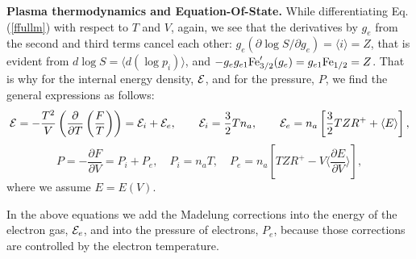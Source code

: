 {\bf Plasma thermodynamics and Equation-Of-State.} 
While differentiating Eq.(\ref{ffullm}) with respect to $T$ and $V$, again, we see that the derivatives
by $g_e$ from the second and third terms cancel 
each other: $g_e(\partial \log S/\partial g_e)=\langle i\rangle=Z$,
that is evident from $d \log S = \langle d (\log p_i) \rangle$,
and $-g_eg_{e1}{\rm Fe}^\prime_{3/2}(g_e)=g_{e1}{\rm Fe}_{1/2}=Z$.
That is why for the internal energy density,
${\cal E}$, and for the pressure, $P$, we find the general expressions
as follows:
\begin{equation}\label{generalE}
{\cal E} = -\frac{T^2}V\left(\frac{\partial}{\partial T}\left(\frac F T\right)\right)=
{\cal E}_i+{\cal E}_e,\qquad{\cal E}_i=\frac32Tn_a,\qquad
{\cal E}_e = n_a\left[ \frac32 T Z R^+ + \langle E \rangle \right],
\end{equation}
\begin{equation}\label{generalP}
P = -\frac{\partial F}{\partial V}=P_i+P_e,\quad
P_i = n_aT,\quad
P_e = n_a \left[ T ZR^+ - V \langle \frac{\partial E}{\partial V} \rangle \right],
\end{equation}
where we assume $E=E(V)$.

In the above equations we add the Madelung corrections into the energy of the electron gas, ${\cal E}_e$, and
into the pressure of electrons, $P_e$, because those corrections are controlled by the electron temperature.


